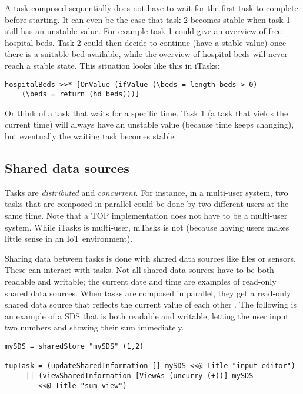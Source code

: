 
A task composed sequentially does not have to wait for the first task to complete before starting. It can even be the case that task 2 becomes stable when task 1 still has an unstable value. For example task 1 could give an overview of free hospital beds. Task 2 could then decide to continue (have a stable value) once there is a suitable bed available, while the overview of hospital beds will never reach a stable state. This situation looks like this in iTasks:

\medskip
\begin{verbatim}
hospitalBeds >>* [OnValue (ifValue (\beds = length beds > 0)
    (\beds = return (hd beds)))]
\end{verbatim}

Or think of a task that waits for a specific time. Task 1 (a task that yields the current time) will always have an unstable value (because time keeps changing), but eventually the waiting task becomes stable.

\subsection{Shared data sources}\label{section-top-sds}
Tasks are \textit{distributed} and \textit{concurrent}. For instance, in a multi-user system, two tasks that are composed in parallel could be done by two different users at the same time. Note that a TOP implementation does not have to be a multi-user system. While iTasks is multi-user, mTasks is not (because having users makes little sense in an IoT environment).

Sharing data between tasks is done with shared data sources like files or sensors. These can interact with tasks. Not all shared data sources have to be both readable and writable; the current date and time are examples of read-only shared data sources.
When tasks are composed in parallel, they get a read-only shared data source that reflects the current value of each other \cite[\S 2.1]{plasmeijer2012task}. The following is an example of a SDS that is both readable and writable, letting the user input two numbers and showing their sum immediately.

\medskip
\begin{verbatim}
mySDS = sharedStore "mySDS" (1,2)

tupTask = (updateSharedInformation [] mySDS <<@ Title "input editor")
    -|| (viewSharedInformation [ViewAs (uncurry (+))] mySDS
        <<@ Title "sum view")
\end{verbatim}

